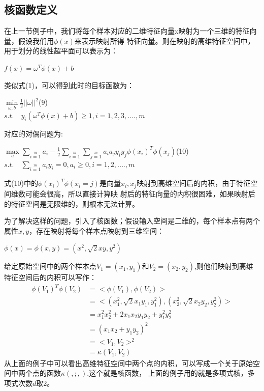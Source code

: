 \documentclass[UTF8]{ctexart}
\begin{document}
{\subsection{核函数定义}
在上一节例子中，我们将每个样本对应的二维特征向量x映射为一个三维的特征向量，假设我们用$\phi(x)$来表示映射所得
特征向量。则在映射的高维特征空间中，用于划分的线性超平面可以表示为：
\begin{center}
    \Large{
        $f(x)=\omega^T\phi(x)+b$
    }
\end{center}\par
类似式(1)，可以得到此时的目标函数为：
\begin{center}
    \Large{
        $\min\limits_{\omega,b}\frac{1}{2}||\omega||^2$\quad(9)\\[2ex]
        $s.t.\quad y_i(\omega^T\phi(x)+b)\geq1,i=1,2,3,....,m$
    }
\end{center}\par
对应的对偶问题为:
\begin{center}
    \Large{
        $\max\limits_{a}\sum\limits_{i=1}\limits^ma_i-\frac{1}{2}\sum\limits_{i=1}\limits^m\sum\limits_{j=1}
        \limits^ma_ia_jy_iy_j\phi(x_i)^T\phi(x_j)$\quad(10)\\[2ex]
        $s.t.\quad\sum\limits_{i=1}\limits^ma_iy_i=0,a_i\geq 0,i=1,2,....,m$
    }    
\end{center}
式(10)中的$\phi(x_i)^T\phi(x_i=j)$是向量$x_i,x_j$映射到高维空间后的内积，由于特征空间维数可能会很高，所以直接计算映
射后的特征向量的内积很困难，如果映射后的特征空间是无限维的，则根本无法计算。\par
为了解决这样的问题，引入了核函数；假设输入空间是二维的，每个样本点有两个属性$x,y$，存在映射将每个样本点映射到三维空间：
\begin{center}
    \Large{
        $\phi(x)=\phi(x,y)=(x^2,\sqrt{2}xy,y^2)$
    }
\end{center}\par
给定原始空间中的两个样本点$V_1=(x_1,y_1)$和$V_2=(x_2,y_2)$,则他们映射到高维特征空间后的内积可以写作：
\begin{align*}
        \phi(V_1)^T\phi(V_2)&=<\phi(V_1),\phi(V_2)>\\
        &=<(x_1^2,\sqrt{2}x_1y_1,y_1^2),(x_2^2,\sqrt{2}x_2y_2,y_2^2)>\\
        &=x_1^2x_2^2+2x_1x_2y_1y_2+y_1^2y_2^2\\
        &=(x_1x_2+y_1y_2)^2\\
        &=<V_1,V_2>^2\\
        &=\kappa(V_1,V_2)
\end{align*}
从上面的例子中可以看出高维特征空间中两个点的内积，可以写成一个关于原始空间中两个点的函数$\kappa(,;,)$,这个就是核函数，
上面的例子用的就是多项式核，多项式次数$d$取2。
}
\end{document}
